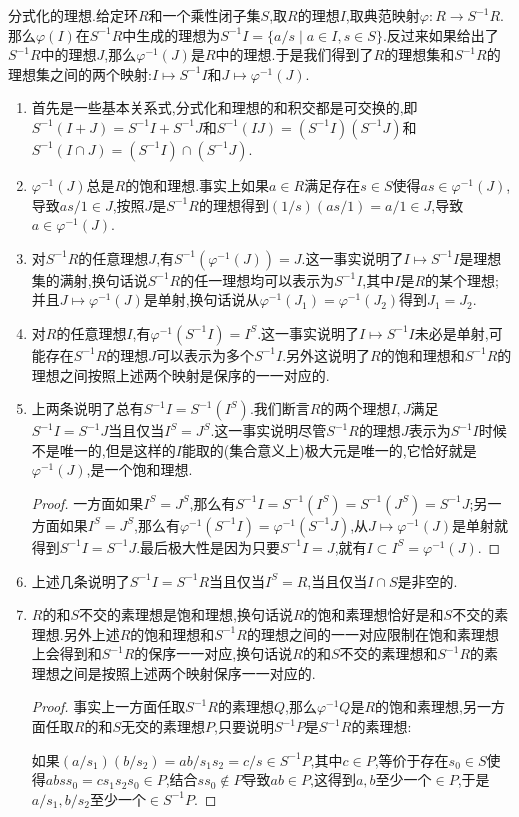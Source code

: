 分式化的理想.给定环$R$和一个乘性闭子集$S$,取$R$的理想$I$,取典范映射$\varphi:R\to S^{-1}R$.那么$\varphi(I)$在$S^{-1}R$中生成的理想为$S^{-1}I=\{a/s\mid a\in I,s\in S\}$.反过来如果给出了$S^{-1}R$中的理想$J$,那么$\varphi^{-1}(J)$是$R$中的理想.于是我们得到了$R$的理想集和$S^{-1}R$的理想集之间的两个映射:$I\mapsto S^{-1}I$和$J\mapsto\varphi^{-1}(J)$.
\begin{enumerate}
	\item 首先是一些基本关系式,分式化和理想的和积交都是可交换的,即$S^{-1}(I+J)=S^{-1}I+S^{-1}J$和$S^{-1}(IJ)=(S^{-1}I)(S^{-1}J)$和$S^{-1}(I\cap J)=(S^{-1}I)\cap(S^{-1}J)$.
	\item $\varphi^{-1}(J)$总是$R$的饱和理想.事实上如果$a\in R$满足存在$s\in S$使得$as\in\varphi^{-1}(J)$,导致$as/1\in J$,按照$J$是$S^{-1}R$的理想得到$(1/s)(as/1)=a/1\in J$,导致$a\in\varphi^{-1}(J)$.
	\item 对$S^{-1}R$的任意理想$J$,有$S^{-1}(\varphi^{-1}(J))=J$.这一事实说明了$I\mapsto S^{-1}I$是理想集的满射,换句话说$S^{-1}R$的任一理想均可以表示为$S^{-1}I$,其中$I$是$R$的某个理想;并且$J\mapsto\varphi^{-1}(J)$是单射,换句话说从$\varphi^{-1}(J_1)=\varphi^{-1}(J_2)$得到$J_1=J_2$.
	\item 对$R$的任意理想$I$,有$\varphi^{-1}(S^{-1}I)=I^S$.这一事实说明了$I\mapsto S^{-1}I$未必是单射,可能存在$S^{-1}R$的理想$J$可以表示为多个$S^{-1}I$.另外这说明了$R$的饱和理想和$S^{-1}R$的理想之间按照上述两个映射是保序的一一对应的.
	\item 上两条说明了总有$S^{-1}I=S^{-1}(I^S)$.我们断言$R$的两个理想$I,J$满足$S^{-1}I=S^{-1}J$当且仅当$I^S=J^S$.这一事实说明尽管$S^{-1}R$的理想$J$表示为$S^{-1}I$时候不是唯一的,但是这样的$I$能取的(集合意义上)极大元是唯一的,它恰好就是$\varphi^{-1}(J)$,是一个饱和理想.
	\begin{proof}
	
	一方面如果$I^S=J^S$,那么有$S^{-1}I=S^{-1}(I^S)=S^{-1}(J^S)=S^{-1}J$;另一方面如果$I^S=J^S$,那么有$\varphi^{-1}(S^{-1}I)=\varphi^{-1}(S^{-1}J)$,从$J\mapsto\varphi^{-1}(J)$是单射就得到$S^{-1}I=S^{-1}J$.最后极大性是因为只要$S^{-1}I=J$,就有$I\subset I^S=\varphi^{-1}(J)$.
	\end{proof}
    \item 上述几条说明了$S^{-1}I=S^{-1}R$当且仅当$I^S=R$,当且仅当$I\cap S$是非空的.
    \item $R$的和$S$不交的素理想是饱和理想,换句话说$R$的饱和素理想恰好是和$S$不交的素理想.另外上述$R$的饱和理想和$S^{-1}R$的理想之间的一一对应限制在饱和素理想上会得到和$S^{-1}R$的保序一一对应,换句话说$R$的和$S$不交的素理想和$S^{-1}R$的素理想之间是按照上述两个映射保序一一对应的.
    \begin{proof}
    	
    	事实上一方面任取$S^{-1}R$的素理想$Q$,那么$\varphi^{-1}Q$是$R$的饱和素理想,另一方面任取$R$的和$S$无交的素理想$P$,只要说明$S^{-1}P$是$S^{-1}R$的素理想:
    	
    	如果$(a/s_1)(b/s_2)=ab/s_1s_2=c/s\in S^{-1}P$,其中$c\in P$,等价于存在$s_0\in S$使得$abss_0=cs_1s_2s_0\in P$,结合$ss_0\not\in P$导致$ab\in P$,这得到$a,b$至少一个$\in P$,于是$a/s_1,b/s_2$至少一个$\in S^{-1}P$.
    \end{proof}
\end{enumerate}

